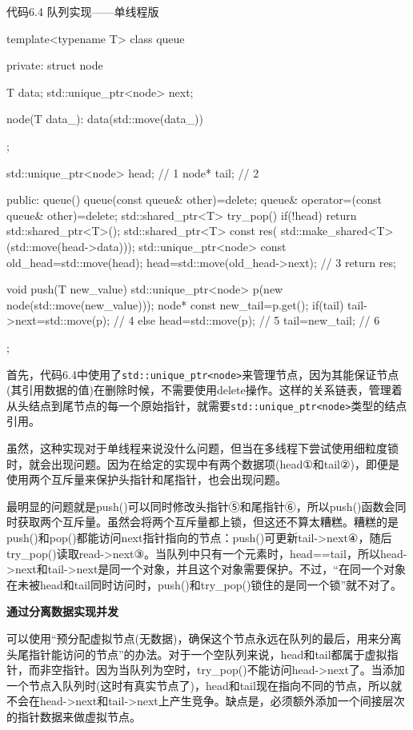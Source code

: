 代码6.4 队列实现——单线程版

\begin{cpp}
template<typename T>
class queue
{
private:
  struct node
  {
    T data;
    std::unique_ptr<node> next;

    node(T data_):
    data(std::move(data_))
    {}
  };

  std::unique_ptr<node> head;  // 1
  node* tail;  // 2

public:
  queue()
  {}
  queue(const queue& other)=delete;
  queue& operator=(const queue& other)=delete;
  std::shared_ptr<T> try_pop()
  {
    if(!head)
    {
      return std::shared_ptr<T>();
    }
    std::shared_ptr<T> const res(
      std::make_shared<T>(std::move(head->data)));
    std::unique_ptr<node> const old_head=std::move(head);
    head=std::move(old_head->next);  // 3
    return res;
  }

  void push(T new_value)
  {
    std::unique_ptr<node> p(new node(std::move(new_value)));
    node* const new_tail=p.get();
    if(tail)
    {
      tail->next=std::move(p);  // 4
    }
    else
    {
      head=std::move(p);  // 5
    }
    tail=new_tail;  // 6
  }
};
\end{cpp}

首先，代码6.4中使用了\texttt{std::unique\_ptr<node>}来管理节点，因为其能保证节点(其引用数据的值)在删除时候，不需要使用delete操作。这样的关系链表，管理着从头结点到尾节点的每一个原始指针，就需要\texttt{std::unique\_ptr<node>}类型的结点引用。

虽然，这种实现对于单线程来说没什么问题，但当在多线程下尝试使用细粒度锁时，就会出现问题。因为在给定的实现中有两个数据项(head①和tail②)，即便是使用两个互斥量来保护头指针和尾指针，也会出现问题。

最明显的问题就是push()可以同时修改头指针⑤和尾指针⑥，所以push()函数会同时获取两个互斥量。虽然会将两个互斥量都上锁，但这还不算太糟糕。糟糕的是push()和pop()都能访问next指针指向的节点：push()可更新tail->next④，随后try\_pop()读取read->next③。当队列中只有一个元素时，head==tail，所以head->next和tail->next是同一个对象，并且这个对象需要保护。不过，“在同一个对象在未被head和tail同时访问时，push()和try\_pop()锁住的是同一个锁”就不对了。

\textbf{通过分离数据实现并发}

可以使用“预分配虚拟节点(无数据)，确保这个节点永远在队列的最后，用来分离头尾指针能访问的节点”的办法。对于一个空队列来说，head和tail都属于虚拟指针，而非空指针。因为当队列为空时，try\_pop()不能访问head->next了。当添加一个节点入队列时(这时有真实节点了)，head和tail现在指向不同的节点，所以就不会在head->next和tail->next上产生竞争。缺点是，必须额外添加一个间接层次的指针数据来做虚拟节点。

